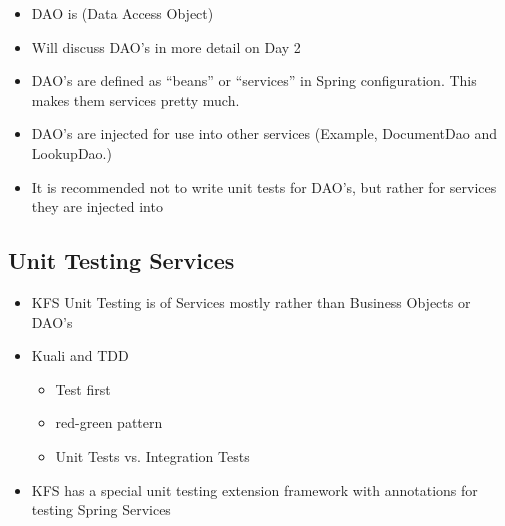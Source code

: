 \begin{ifhtml}
\begin{s5slide}
    \begin{s5notes}
      \begin{itemize}
      \item DAO is (Data Access Object)
      \item Will discuss DAO's in more detail on Day 2
      \item DAO's are defined as ``beans'' or ``services'' in Spring configuration. This makes them services pretty much.
      \item DAO's are injected for use into other services (Example, DocumentDao and LookupDao.)
      \item It is recommended not to write unit tests for DAO's, but rather for services they are injected into
      \end{itemize}
    \end{s5notes} 
  \end{s5slide}

  \begin{s5slide}
    \section{Unit Testing Services}
    \begin{itemize}
      \item KFS Unit Testing is of Services mostly rather than Business Objects or DAO's
      \item Kuali and TDD
        \begin{itemize}
          \item Test first
          \item red-green pattern
          \item Unit Tests vs. Integration Tests
        \end{itemize}
      \item KFS has a special unit testing extension framework with annotations for testing Spring Services
    \end{itemize}


\end{s5slide}
\end{ifhtml}
